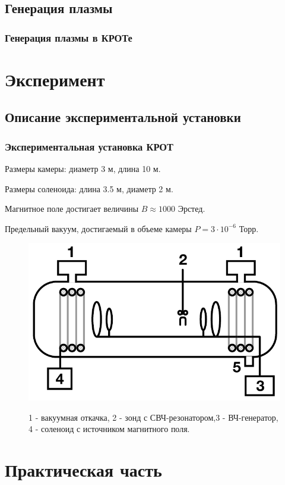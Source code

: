 \documentclass[10pt,pdf,hyperref={unicode}, dvipsnames]{beamer}
\begin{document}
\subsection{Генерация плазмы}
\begin{frame}
	\frametitle{Генерация плазмы в КРОТе}
\end{frame}
\section{Эксперимент}
\subsection{Описание экспериментальной установки}
\begin{frame}
	\frametitle{Экспериментальная установка КРОТ}
	Размеры камеры: диаметр 3 м, длина 10 м.

	Размеры соленоида: длина 3.5 м, диаметр 2 м. 
	
	Магнитное поле достигает величины $B\approx 1000$ Эрстед. 
	
	Предельный вакуум, достигаемый в объеме камеры $P =3\cdot10^{-6}$ Торр. 
	\begin{figure}[tb]
		\vspace{0pt}
		\centering
		\includegraphics[width=0.6\linewidth]{fig/krot}
		\label{fig:krot}
		\caption{1 - вакуумная откачка, 2 - зонд с СВЧ-резонатором,3 - ВЧ-генератор, 4 - соленоид с источником магнитного поля.}
	\end{figure}
\end{frame}
\section{Практическая часть} %
\end{document}
